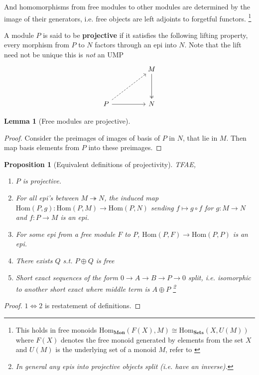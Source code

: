 \documentclass[12pt]{article}
\numberwithin{equation}{section}
\newcommand{\Hom}{{\mathrm{Hom}}}
\newcounter{dummy} \numberwithin{dummy}{section}
\newtheorem{lemma}[dummy]{Lemma}
\newtheorem{proposition}[dummy]{Proposition}
\begin{document}
\begin{appendices}
	And homomorphisms from free modules to other modules are determined by the image of their generators, i.e. free objects are left adjoints to forgetful functors. \footnote{This holds in free monoids $\mathrm{Hom}_\mathbf{Mon}(F(X), M) \cong \mathrm{Hom}_\mathbf{Sets} (X, U(M))$ where $F(X)$ denotes the free monoid generated by elements from the set $X$ and $U(M)$ is the underlying set of a monoid $M$, refer to \cite[p. ~208]{Awodey} }
	
	A module $P$ is said to be \textbf{projective} if it satisfies the following lifting property, every morphism from $P$ to $N$ factors through an epi into $N$. Note that the lift need not be unique this is \textit{not} an UMP
	\[\begin{tikzcd}
		&& M \\
		\\
		P && N
		\arrow[two heads, from=1-3, to=3-3]
		\arrow[from=3-1, to=3-3]
		\arrow[dashed, from=3-1, to=1-3]
	\end{tikzcd}\]
	

	\begin{lemma}[Free modules are projective]
	\end{lemma}
	\begin{proof}
		Consider the preimages of images of basis of $P$ in $N$, that lie in $M$. Then map basis elements from $P$ into these preimages.
	\end{proof}
	\begin{proposition}[Equivalent definitions of projectivity]\label{projtfae}
		TFAE,
		\begin{enumerate}
			\item $P$ is projective.
			\item For all epi's between $M\twoheadrightarrow N$, the induced map $\Hom(P,g):\mathrm{Hom}(P,M) \to \mathrm{Hom}(P,N)$ sending $f \mapsto g \circ f$ for $g:M \to N$ and $f:P \to M$ is an epi.
			\item For some epi from a free module $F$ to $P$, $\mathrm{Hom}(P,F) \to \mathrm{Hom}(P,P)$ is an epi.
			\item There exists $Q$ s.t. $P \oplus Q$ is free
			\item Short exact sequences of the form $0 \to A \to B \to P \to 0$ split, i.e. isomorphic to another short exact where middle term is $A \oplus P$ \footnote{In general any epis into projective objects split (i.e. have an inverse).}
		\end{enumerate}
	\end{proposition}
	\begin{proof}
		$1 \iff 2$ is restatement of definitions.
		

\end{proof}
\end{appendices}
\end{document}
